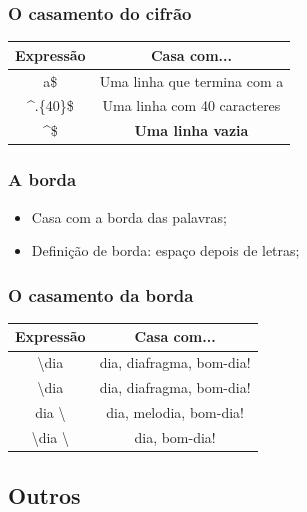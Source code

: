 \begin{frame}
	\frametitle{O casamento do cifrão}

	\begin{center}
	\begin{tabular}{c|c}
		\textbf{Expressão} & \textbf{Casa com...} \\ \hline
		a\$		& Uma linha que termina com a \\ \hline
		\textasciicircum .\{40\}\$ & Uma linha com 40 caracteres \\ \hline
		\textasciicircum \$ & \textbf{Uma linha vazia}		\\ \hline
	\end{tabular}
	\end{center}

\end{frame}
\begin{frame}
	\frametitle{A borda}

	\begin{itemize}
		\item Casa com a borda das palavras;
		\item Definição de borda: espaço depois de letras;
	\end{itemize}
\end{frame}

\begin{frame}
	\frametitle{O casamento da borda}
	\begin{center}
	\begin{tabular}{c|c}
		\textbf{Expressão} & \textbf{Casa com...} \\ \hline
		\textbackslash dia & dia, diafragma, bom-dia! \\ \hline
		\textbackslash dia & dia, diafragma, bom-dia! \\ \hline
		dia \textbackslash & dia, melodia, bom-dia! \\ \hline
		\textbackslash dia \textbackslash & dia, bom-dia! \\ \hline
	\end{tabular}
	\end{center}
	
\end{frame}


\subsection{Outros}


